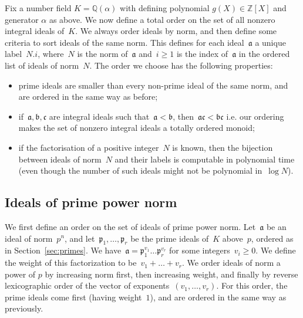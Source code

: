 \documentclass{article}
\def\Z{{\mathbb Z}}
\def\Q{{\mathbb Q}}
\def\a{{\mathfrak a}}
\def\b{{\mathfrak b}}
\def\idc{{\mathfrak c}}
\def\p{{\mathfrak p}}
\begin{document}
Fix a number field $K=\Q(\alpha)$ with defining polynomial
$g(X)\in\Z[X]$ and generator $\alpha$ as above. 
We now define a total order on the set of all nonzero integral ideals of~$K$.
We always order ideals by norm, and then define some criteria to sort ideals of
the same norm. This defines for each ideal~$\a$ a unique label~$N.i$, where~$N$
is the norm of~$\a$ and~$i\ge 1$ is the index of~$\a$ in the ordered list of
ideals of norm~$N$.
The order we choose has the following properties:
\begin{itemize}
  \item prime ideals are smaller than every non-prime ideal of the same norm,
    and are ordered in the same way as before;
  \item if~$\a,\b,\idc$ are integral ideals such that~$\a<\b$, then~$\a\idc<\b\idc$
    i.e. our ordering makes the set of nonzero integral ideals a totally ordered
    monoid;
  \item if the factorisation of a positive integer~$N$ is known, then the
    bijection between ideals of norm~$N$ and their labels is computable in
    polynomial time (even though the number of such ideals might not be
    polynomial in~$\log N$).
\end{itemize}

\subsection{Ideals of prime power norm}\label{sec:primepowernorm}

We first define an order on the set of ideals of prime power
norm. Let~$\a$ be an ideal of norm~$p^n$, and let~$\p_1,\dots,\p_r$ be
the prime ideals of~$K$ above~$p$, ordered as in
Section~\ref{sec:primes}. We have~$\a = \p_1^{v_1}\dots \p_r^{v_r}$
for some integers~$v_i\ge 0$. We define the weight of this
factorization to be~$v_1+\dots+v_r$. We order ideals of norm a power
of $p$ by increasing norm first, then increasing weight, and finally
by reverse lexicographic order of the vector of
exponents~$(v_1,\dots,v_r)$. For this order, the prime ideals come
first (having weight~$1$), and are ordered in the same way as
previously.
\end{document}
